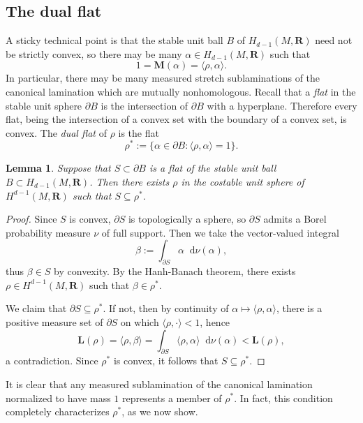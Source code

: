 \documentclass[reqno,11pt]{amsart}
\newcommand{\RR}{\mathbf{R}}
\newcommand*\dif{\mathop{}\!\mathrm{d}}
\newcommand{\Mass}{\mathbf M}
\newcommand{\Comass}{\mathbf L}
\newcommand{\dfn}[1]{\emph{#1}\index{#1}}
\newtheorem{lemma}[theorem]{Lemma}
\theoremstyle{definition}
\numberwithin{equation}{section}
\begin{document}
\subsection{The dual flat}
A sticky technical point is that the stable unit ball $B$ of $H_{d - 1}(M, \RR)$ need not be strictly convex, so there may be many $\alpha \in H_{d - 1}(M, \RR)$ such that
\begin{equation}\label{flats duality}
1 = \Mass(\alpha) = \langle \rho, \alpha\rangle.
\end{equation}
In particular, there may be many measured stretch sublaminations of the canonical lamination which are mutually nonhomologous.
Recall that a \dfn{flat} in the stable unit sphere $\partial B$ is the intersection of $\partial B$ with a hyperplane.
Therefore every flat, being the intersection of a convex set with the boundary of a convex set, is convex.
The \dfn{dual flat} of $\rho$ is the flat
$$\rho^* := \{\alpha \in \partial B: \langle \rho, \alpha\rangle = 1\}.$$

\begin{lemma} \label{flats have dual classes}
Suppose that $S \subset \partial B$ is a flat of the stable unit ball $B \subset H_{d - 1}(M, \RR)$.
Then there exists $\rho$ in the costable unit sphere of $H^{d - 1}(M, \RR)$ such that $S \subseteq \rho^*$.
\end{lemma}
\begin{proof}
Since $S$ is convex, $\partial S$ is topologically a sphere, so $\partial S$ admits a Borel probability measure $\nu$ of full support.
Then we take the vector-valued integral 
$$\beta := \int_{\partial S} \alpha \dif \nu(\alpha),$$
thus $\beta \in S$ by convexity.
By the Hanh-Banach theorem, there exists $\rho \in H^{d - 1}(M, \RR)$ such that $\beta \in \rho^*$.

We claim that $\partial S \subseteq \rho^*$.
If not, then by continuity of $\alpha \mapsto \langle \rho, \alpha\rangle$, there is a positive measure set of $\partial S$ on which $\langle \rho, \cdot\rangle < 1$, hence
$$\Comass(\rho) = \langle \rho, \beta\rangle = \int_{\partial S} \langle \rho, \alpha\rangle \dif \nu(\alpha) < \Comass(\rho),$$
a contradiction.
Since $\rho^*$ is convex, it follows that $S \subseteq \rho^*$.
\end{proof}

It is clear that any measured sublamination of the canonical lamination normalized to have mass $1$ represents a member of $\rho^*$.
In fact, this condition completely characterizes $\rho^*$, as we now show.
\end{document}
